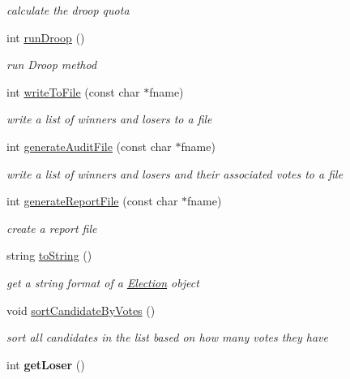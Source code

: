 \begin{DoxyCompactItemize}
\begin{DoxyCompactList}\small\item\em calculate the droop quota \end{DoxyCompactList}\item 
int \hyperlink{classElection_af2fdcf119a21d5fdcdafd9dc571248fa}{run\+Droop} ()\hypertarget{classElection_af2fdcf119a21d5fdcdafd9dc571248fa}{}\label{classElection_af2fdcf119a21d5fdcdafd9dc571248fa}

\begin{DoxyCompactList}\small\item\em run Droop method \end{DoxyCompactList}\item 
int \hyperlink{classElection_a4c48413712894394b122793c3b8da9a1}{write\+To\+File} (const char $\ast$fname)
\begin{DoxyCompactList}\small\item\em write a list of winners and losers to a file \end{DoxyCompactList}\item 
int \hyperlink{classElection_aff17d52000a3b3f4a0272fa98529f0c6}{generate\+Audit\+File} (const char $\ast$fname)
\begin{DoxyCompactList}\small\item\em write a list of winners and losers and their associated votes to a file \end{DoxyCompactList}\item 
int \hyperlink{classElection_a110e20ed39a0aeabe0e063a554441ce3}{generate\+Report\+File} (const char $\ast$fname)
\begin{DoxyCompactList}\small\item\em create a report file \end{DoxyCompactList}\item 
string \hyperlink{classElection_aad4de7f2d406fa8dd8e2df8dbd8d747f}{to\+String} ()
\begin{DoxyCompactList}\small\item\em get a string format of a \hyperlink{classElection}{Election} object \end{DoxyCompactList}\item 
void \hyperlink{classElection_abe4ec6ad552c77f7e4b30d1f0a3be883}{sort\+Candidate\+By\+Votes} ()\hypertarget{classElection_abe4ec6ad552c77f7e4b30d1f0a3be883}{}\label{classElection_abe4ec6ad552c77f7e4b30d1f0a3be883}

\begin{DoxyCompactList}\small\item\em sort all candidates in the list based on how many votes they have \end{DoxyCompactList}\item 
int {\bfseries get\+Loser} ()\hypertarget{classElection_a9256c8b2ffce561c64dd618bf96c6d81}{}\label{classElection_a9256c8b2ffce561c64dd618bf96c6d81}


\end{DoxyCompactItemize}
